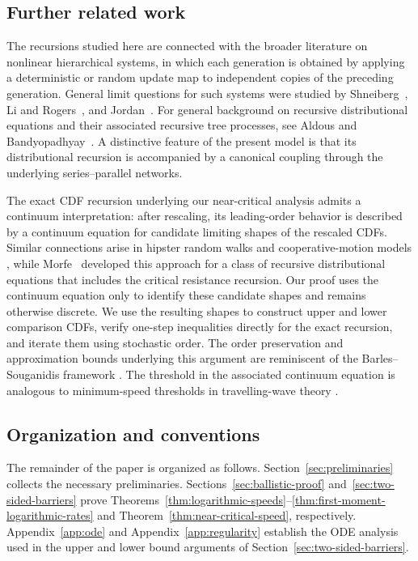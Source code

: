 \documentclass[12pt,preprint]{amsart}
\numberwithin{equation}{section}
\theoremstyle{plain}
\theoremstyle{definition}
\begin{document}
\subsection{Further related work}

The recursions studied here are connected with the broader literature on
nonlinear hierarchical systems, in which each generation is obtained by
applying a deterministic or random update map to independent copies of the
preceding generation.  General limit questions for such systems were studied
by Shneiberg~\cite{Shneiberg1986}, Li and Rogers~\cite{LiRogers1999}, and
Jordan~\cite{Jordan2002}.  For general background on recursive distributional
equations and their associated recursive tree processes, see Aldous and
Bandyopadhyay~\cite{AldousBandyopadhyay2005}.  A distinctive feature of the
present model is that its distributional recursion is accompanied by a
canonical coupling through the underlying series--parallel networks.

The exact CDF recursion underlying our near-critical analysis admits a
continuum interpretation: after rescaling, its leading-order behavior is
described by a continuum equation for candidate limiting shapes of the
rescaled CDFs.  Similar connections arise in hipster random walks and
cooperative-motion models
\cite{AddarioBerryEtAl2020,AddarioBerryBeckmanLin2022,
AddarioBerryBeckmanLin2024}, while Morfe~\cite{Morfe2026} developed this
approach for a class of recursive distributional equations that includes the
critical resistance recursion.  Our proof uses
the continuum equation
only to identify these candidate shapes and remains otherwise discrete.  We
use the resulting shapes to construct upper and lower comparison CDFs, verify
one-step inequalities directly for the exact recursion, and iterate them
using stochastic order.  The order preservation and approximation bounds
underlying this argument are reminiscent of the Barles--Souganidis framework
\cite{BarlesSouganidis1991}.  The threshold in the associated continuum
equation is analogous to minimum-speed thresholds in travelling-wave theory
\cite{HadelerRothe1975,SanchezGardunoMaini1994}.

\subsection{Organization and conventions}
\label{sec:organization-conventions}

The remainder of the paper is organized as follows.
Section~\ref{sec:preliminaries} collects the necessary preliminaries.
Sections~\ref{sec:ballistic-proof}
and~\ref{sec:two-sided-barriers} prove
Theorems~\ref{thm:logarithmic-speeds}--\ref{thm:first-moment-logarithmic-rates}
and Theorem~\ref{thm:near-critical-speed}, respectively.
Appendix~\ref{app:ode} and Appendix~\ref{app:regularity} establish the
ODE analysis used in the upper and lower bound arguments of Section~\ref{sec:two-sided-barriers}.
\end{document}
